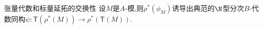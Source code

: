 \begin{proposition}{张量代数和标量延拓的交换性}{}
	设$M$是$A$-模,则$\rho^{\ast}\left(\phi_{M}\right)$诱导出典范的$\N$型分次$B$-代数同构$\psi:\mathsf{T}\left(\rho^{\ast}\left(M\right)\right)\to\rho^{\ast}\left(\mathsf{T}\left(M\right)\right)$.
\end{proposition}














